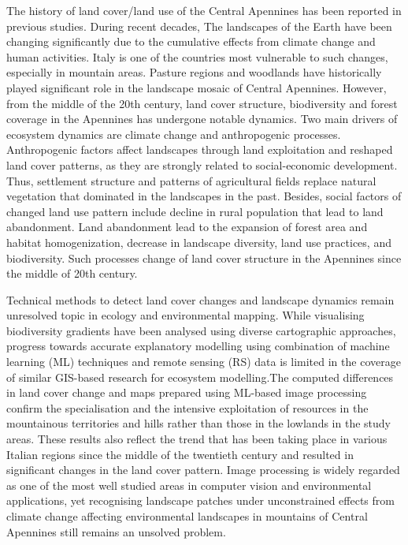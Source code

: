 \documentclass[jimaging,article,submit,pdftex,moreauthors]{Definitions/mdpi}
\begin{document}
The history of land cover/land use of the Central Apennines has been reported in previous studies. During recent decades, The landscapes of the Earth have been changing significantly due to the cumulative effects from climate change and human activities. Italy is one of the countries most vulnerable to such changes, especially in mountain areas. Pasture regions and woodlands have historically played significant role in the landscape mosaic of Central Apennines. However, from the middle of the 20th century, land cover structure, biodiversity and forest coverage in the Apennines has undergone notable dynamics.
Two main drivers of ecosystem dynamics are climate change and anthropogenic processes. Anthropogenic factors affect landscapes through land exploitation and reshaped land cover patterns, as they are strongly related to social-economic development. Thus, settlement structure and patterns of agricultural fields replace natural vegetation that dominated in the landscapes in the past. Besides, social factors of changed land use pattern include decline in rural population that lead to land abandonment. Land abandonment lead to the expansion of forest area and habitat homogenization, decrease in landscape diversity, land use practices, and biodiversity. Such processes change of land cover structure in the Apennines since the middle of 20th century.

Technical methods to detect land cover changes and landscape dynamics remain unresolved topic in ecology and environmental mapping. While visualising biodiversity gradients have been analysed using diverse cartographic approaches, progress towards accurate explanatory modelling using combination of machine learning (ML) techniques and remote sensing (RS) data is limited in the coverage of similar GIS-based research for ecosystem modelling.The computed differences in land cover change and maps prepared using ML-based image processing confirm the specialisation and the intensive exploitation of resources in the mountainous territories and hills rather than those in the lowlands in the study areas. These results also reflect the trend that has been taking place in various Italian regions since the middle of the twentieth century and resulted in significant changes in the land cover pattern. Image processing is widely regarded as one of the most well studied areas in computer vision and environmental applications, yet recognising landscape patches under unconstrained effects from climate change affecting environmental landscapes in mountains of Central Apennines still remains an unsolved problem. 
\end{document}
